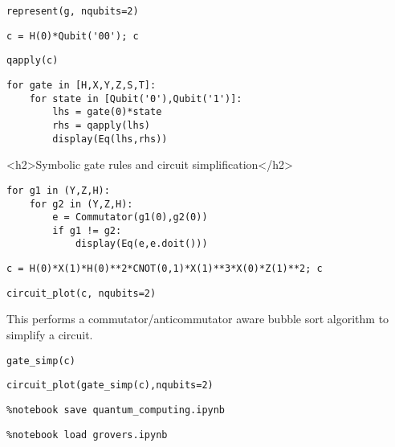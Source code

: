 \begin{verbatim}
represent(g, nqubits=2)
\end{verbatim}

\begin{verbatim}
c = H(0)*Qubit('00'); c
\end{verbatim}

\begin{verbatim}
qapply(c)
\end{verbatim}

\begin{verbatim}
for gate in [H,X,Y,Z,S,T]:
    for state in [Qubit('0'),Qubit('1')]:
        lhs = gate(0)*state
        rhs = qapply(lhs)
        display(Eq(lhs,rhs))
\end{verbatim}

<h2>Symbolic gate rules and circuit simplification</h2>

\begin{verbatim}
for g1 in (Y,Z,H):
    for g2 in (Y,Z,H):
        e = Commutator(g1(0),g2(0))
        if g1 != g2:
            display(Eq(e,e.doit()))
\end{verbatim}

\begin{verbatim}
c = H(0)*X(1)*H(0)**2*CNOT(0,1)*X(1)**3*X(0)*Z(1)**2; c
\end{verbatim}

\begin{verbatim}
circuit_plot(c, nqubits=2)
\end{verbatim}

This performs a commutator/anticommutator aware bubble sort algorithm to
simplify a circuit.

\begin{verbatim}
gate_simp(c)
\end{verbatim}

\begin{verbatim}
circuit_plot(gate_simp(c),nqubits=2)
\end{verbatim}

\begin{verbatim}
%notebook save quantum_computing.ipynb
\end{verbatim}

\begin{verbatim}
%notebook load grovers.ipynb
\end{verbatim}

